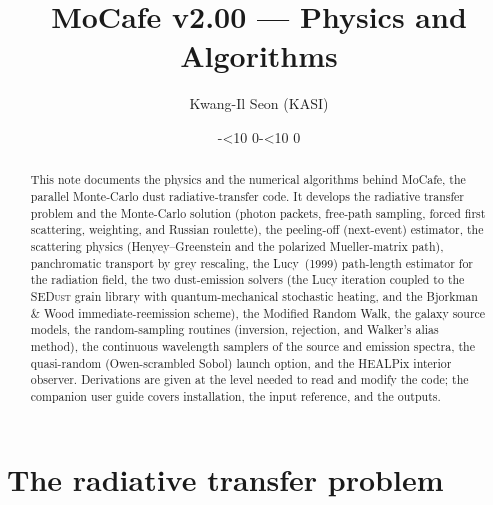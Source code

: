 \documentclass[english,a4paper]{kiseon_memo}
\begin{document}
\title{MoCafe v2.00 --- Physics and Algorithms}
\author{Kwang-Il Seon (KASI)}
\date{\the\year-\ifnum\month<10 0\fi\the\month-\ifnum\day<10 0\fi\the\day}
\maketitle

\begin{abstract}
\noindent
This note documents the physics and the numerical algorithms behind MoCafe, the
parallel Monte-Carlo dust radiative-transfer code.  It develops the radiative
transfer problem and the Monte-Carlo solution (photon packets, free-path
sampling, forced first scattering, weighting, and Russian roulette), the
peeling-off (next-event) estimator, the scattering physics (Henyey--Greenstein
and the polarized Mueller-matrix path), panchromatic transport by grey
rescaling, the Lucy~(1999) path-length estimator for the radiation field, the
two dust-emission solvers (the Lucy iteration coupled to the \textsc{SEDust}
grain library with quantum-mechanical stochastic heating, and the
Bjorkman \& Wood immediate-reemission scheme), the Modified Random Walk, the
galaxy source models, the random-sampling routines (inversion, rejection, and
Walker's alias method), the continuous wavelength samplers of the source and
emission spectra, the quasi-random (Owen-scrambled Sobol) launch option,
and the HEALPix interior observer.  Derivations are
given at the level needed to read and modify the code; the companion user guide
covers installation, the input reference, and the outputs.
\end{abstract}

\tableofcontents
\clearpage

\section{The radiative transfer problem}
\end{document}
